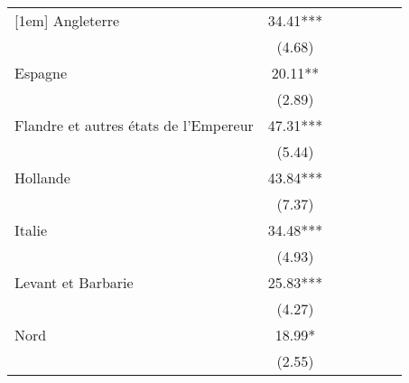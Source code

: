 {\begin{tabular}{l*{6}{c}}
[1em]
Angleterre          &       34.41***&                     &                     &                     &                     &                     \\
                    &      (4.68)         &                     &                     &                     &                     &                     \\
[1em]
Espagne             &       20.11** &                     &                     &                     &                     &                     \\
                    &      (2.89)         &                     &                     &                     &                     &                     \\
[1em]
Flandre et autres états de l'Empereur&       47.31***&                     &                     &                     &                     &                     \\
                    &      (5.44)         &                     &                     &                     &                     &                     \\
[1em]
Hollande            &       43.84***&                     &                     &                     &                     &                     \\
                    &      (7.37)         &                     &                     &                     &                     &                     \\
[1em]
Italie              &       34.48***&                     &                     &                     &                     &                     \\
                    &      (4.93)         &                     &                     &                     &                     &                     \\
[1em]
Levant et Barbarie  &       25.83***&                     &                     &                     &                     &                     \\
                    &      (4.27)         &                     &                     &                     &                     &                     \\
[1em]
Nord                &       18.99*  &                     &                     &                     &                     &                     \\
                    &      (2.55)         &                     &                     &                     &                     &                     \\

\end{tabular}}

